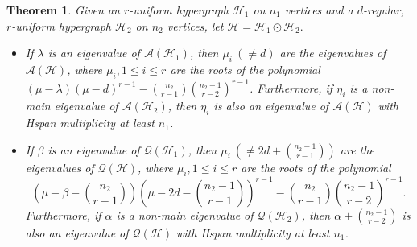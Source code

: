 \documentclass[10pt,a4paper]{amsart}
\newtheorem{theorem}{Theorem}
\begin{document}
	\begin{theorem}
		Given an $r$-uniform hypergraph $\mathcal{H}_1$ on $n_1$ vertices and a $d$-regular, $r$-uniform hypergraph $\mathcal{H}_2$ on $n_2$ vertices, let $\mathcal{H}= \mathcal{H}_1 \odot \mathcal{H}_2. $
		\begin{itemize}
			\item If $\lambda$ is an eigenvalue of $\mathcal{A}(\mathcal{H}_1)$, then $\mu_i ~(\neq d)$ are the eigenvalues of $\mathcal{A}(\mathcal{H})$, 
			where $\mu_i, 1\leq i \leq r$ are the roots of the polynomial $(\mu -\lambda)(\mu-d)^{r-1} - \binom{n_2}{r-1}\binom{n_2-1}{r-2}^{r-1}$.
			Furthermore, if $\eta_i$ is a non-main eigenvalue of $\mathcal{A}(\mathcal{H}_2)$, then $\eta_i$ is also an eigenvalue of $\mathcal{A}(\mathcal{H})$ with Hspan multiplicity at least $n_1$.
			\item If $\beta$ is an eigenvalue of $\mathcal{Q}(\mathcal{H}_1)$, then $\mu_i ~(\neq 2d+\binom{n_2-1}{r-1})$ are the eigenvalues of $\mathcal{Q}(\mathcal{H})$, where $\mu_i, 1\leq i \leq r$ are the roots of the polynomial 
			$$\left(\mu-\beta-\binom{n_2}{r-1}\right)\left(\mu-2d-\binom{n_2-1}{r-1}\right)^{r-1}-\binom{n_2}{r-1}\binom{n_2-1}{r-2}^{r-1}.$$
			Furthermore, if $\alpha$ is a non-main eigenvalue of $\mathcal{Q}(\mathcal{H}_2)$, then $\alpha + \binom{n_2-1}{r-2}$ is also an eigenvalue of $\mathcal{Q}(\mathcal{H})$ with Hspan multiplicity at least $n_1$.
		\end{itemize}
	\end{theorem}
\end{document}
